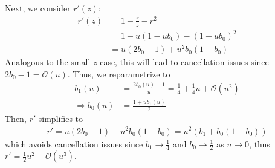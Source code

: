 \documentclass{article}
\begin{document}
Next, we consider $r'(z)$:
%
\begin{align}\label{eq:r-prime-large-reparametrized}
  r'(z) & = 1 - \frac{r}{z} - r^2             \\
        & = 1 - u(1 - u b_0) - (1 - u b_0)^2  \\
        & = u (2 b_0 - 1) + u^2 b_0 (1 - b_0)
\end{align}
%
Analogous to the small-$z$ case, this will lead to cancellation issues since $2b_0 - 1 = \mathcal{O}(u)$.
Thus, we reparametrize to
%
\begin{align}
  b_1(u)             & = \frac{2b_0(u)-1}{u} = \frac{1}{4} + \frac{1}{4} u + \mathcal{O}(u^2) \\
  \Rightarrow b_0(u) & = \frac{1 + u b_1(u)}{2}
\end{align}
%
Then, $r'$ simplifies to
%
\begin{align}
  r' = u(2b_0-1) + u^2 b_0(1-b_0) = u^2 (b_1 + b_0(1-b_0))
\end{align}
%
which avoids cancellation issues since $b_1 \to \frac{1}{4}$ and $b_0 \to \frac{1}{2}$ as $u \to 0$, thus $r' = \frac{1}{2} u^2 + \mathcal{O}(u^3)$.
\end{document}
